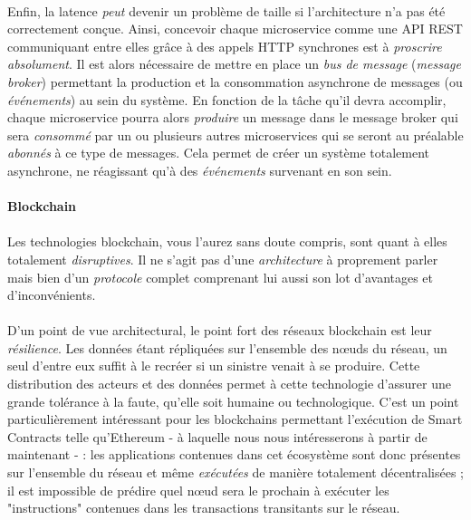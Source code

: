 \paragraph{} Enfin, la latence \emph{peut} devenir un problème de taille si l'architecture n'a pas été correctement conçue.
Ainsi, concevoir chaque microservice comme une API REST communiquant entre elles grâce à des appels HTTP synchrones est à
\emph{proscrire absolument}. Il est alors nécessaire de mettre en place un \emph{bus de message} (\emph{message broker})
permettant la production et la consommation asynchrone de messages (ou \emph{événements}) au sein du système. En fonction
de la tâche qu'il devra accomplir, chaque microservice pourra alors \emph{produire} un message dans le message broker qui
sera \emph{consommé} par un ou plusieurs autres microservices qui se seront au préalable \emph{abonnés} à ce type de messages.
Cela permet de créer un système totalement asynchrone, ne réagissant qu'à des \emph{événements} survenant en son sein.


\paragraph{Blockchain}

\paragraph{} Les technologies blockchain, vous l'aurez sans doute compris, sont quant à elles totalement \emph{disruptives}.
Il ne s'agit pas d'une \emph{architecture} à proprement parler mais bien d'un \emph{protocole} complet comprenant lui aussi
son lot d'avantages et d'inconvénients.

\paragraph{} D'un point de vue architectural, le point fort des réseaux blockchain est leur \emph{résilience}. Les données
étant répliquées sur l'ensemble des n\oe{}uds du réseau, un seul d'entre eux suffit à le recréer si un sinistre venait à se
produire. Cette distribution des acteurs et des données permet à cette technologie d'assurer une grande tolérance à la faute,
qu'elle soit humaine ou technologique. C'est un point particulièrement intéressant pour les blockchains permettant l'exécution
de Smart Contracts telle qu'Ethereum - à laquelle nous nous intéresserons à partir de maintenant - : les applications contenues
dans cet écosystème sont donc présentes sur l'ensemble du réseau et même \emph{exécutées} de manière totalement décentralisées ;
il est impossible de prédire quel n\oe{}ud sera le prochain à exécuter les "instructions" contenues dans les transactions 
transitants sur le réseau.

